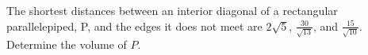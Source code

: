 The shortest distances between an interior diagonal of a rectangular parallelepiped, P, and the edges it does not meet are $2\sqrt{5}$, $\frac{30}{\sqrt{13}}$, and $\frac{15}{\sqrt{10}}$. Determine the volume of $P$.